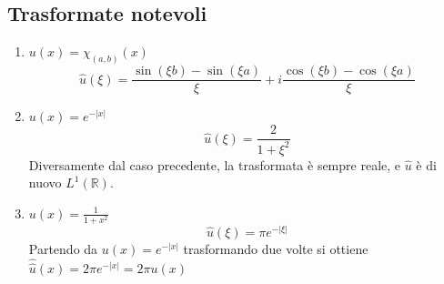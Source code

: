 \documentclass[a4paper]{article}
\newcommand{\R}{\mathbb{R}}
\begin{document}
\subsection{Trasformate notevoli}
\begin{enumerate}
	\item $u(x)=\chi_{(a,b)}(x)$ 
		\[\hat{u}(\xi)= \frac{\sin(\xi b)-\sin(\xi a)}{\xi}+i \frac{\cos(\xi b)-\cos(\xi a)}{\xi}\]
	\item $u(x)=e^{-|x|}$ 
		\[\hat{u}(\xi)= \frac{2}{1+\xi^2}\]
		Diversamente dal caso precedente, la trasformata è sempre reale, e $\hat{u}$ è di nuovo $L^{1}(\R)$.
	\item $u(x)=\frac{1}{1+x^2}$ 
		\[\hat{u}(\xi)= \pi e^{-|\xi|}\]
		Partendo da $u(x)=e^{-|x|}$ trasformando due volte si ottiene $\hat{\hat{u}}(x)=2\pi e^{-|x|}=2\pi u(x)$
\end{enumerate}
\end{document}
